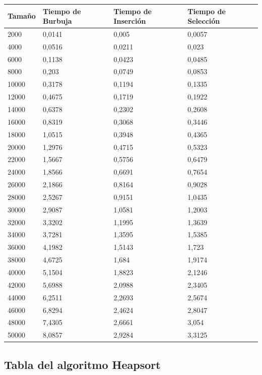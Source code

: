 \documentclass[a4paper, 11pt]{article}
\begin{document}
\begin{tabular}{|l|l|l|l|}
	\hline
	Tamaño &Tiempo de Burbuja &Tiempo de  Inserción &Tiempo de  Selección \\
	\hline
	\hline
	2000 & 0,0141 & 0,005 & 0,0057 \\
	\hline
	4000 & 0,0516 & 0,0211 & 0,023 \\
	\hline
	6000 & 0,1138 & 0,0423 & 0,0485 \\
	\hline
	8000 & 0,203 & 0,0749 & 0,0853 \\
	\hline
	10000 & 0,3178 & 0,1194 & 0,1335 \\
	\hline
	12000 & 0,4675 & 0,1719 & 0,1922 \\
	\hline
	14000 & 0,6378 & 0,2302 & 0,2608 \\
	\hline
	16000 & 0,8319 & 0,3068 & 0,3446 \\
	\hline
	18000 & 1,0515 & 0,3948 & 0,4365 \\
	\hline
	20000 & 1,2976 & 0,4715 & 0,5323 \\
	\hline
	22000 & 1,5667 & 0,5756 & 0,6479 \\
	\hline
	24000 & 1,8566 & 0,6691 & 0,7654 \\
	\hline
	26000 & 2,1866 & 0,8164 & 0,9028 \\
	\hline
	28000 & 2,5267 & 0,9151 & 1,0435 \\
	\hline
	30000 & 2,9087 & 1,0581 & 1,2003 \\
	\hline
	32000 & 3,3202 & 1,1995 & 1,3639 \\
	\hline
	34000 & 3,7281 & 1,3595 & 1,5385 \\
	\hline
	36000 & 4,1982 & 1,5143 & 1,723 \\
	\hline
	38000 & 4,6725 & 1,684 & 1,9174 \\
	\hline
	40000 & 5,1504 & 1,8823 & 2,1246 \\
	\hline
	42000 & 5,6988 & 2,0988 & 2,3405 \\
	\hline
	44000 & 6,2511 & 2,2693 & 2,5674 \\
	\hline
	46000 & 6,8294 & 2,4624 & 2,8047 \\
	\hline
	48000 & 7,4305 & 2,6661 & 3,054 \\
	\hline
	50000 & 8,0857 & 2,9284 & 3,3125 \\
	\hline
\end{tabular}

\subsection{Tabla del algoritmo Heapsort}

\end{document}
